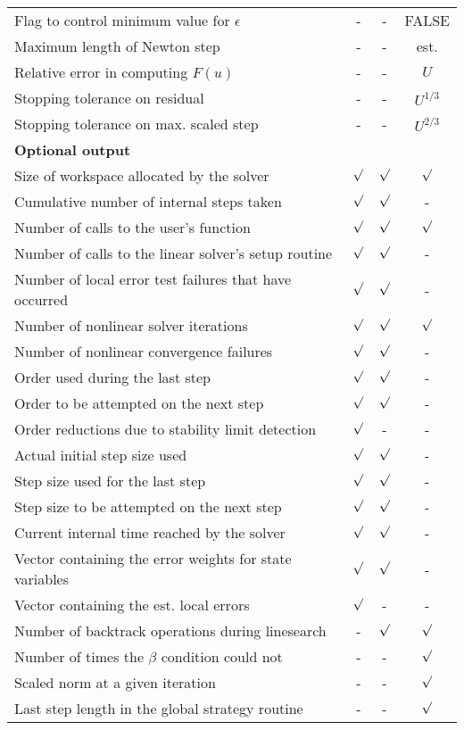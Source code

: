 \begin{table}[tp]
\begin{tabular}{|p{2.75in}|c|c|c|}
Flag to control minimum value for $\epsilon$ & - & - & FALSE \\
Maximum length of Newton step & - & - & est. \\
Relative error in computing $F(u)$ & - & - & $U$ \\
Stopping tolerance on residual & - & - & $U^{1/3}$ \\
Stopping tolerance on max. scaled step & - & - & $U^{2/3}$ \\
\hline
\hline
{\bf Optional output} &  &  & \\
\hline
Size of workspace allocated by the solver & $\surd$ & $\surd$ & $\surd$ \\
Cumulative number of internal steps taken & $\surd$ & $\surd$ & - \\
Number of calls to the user's function & $\surd$ & $\surd$ & $\surd$ \\
Number of calls to the linear solver's setup routine & $\surd$ & $\surd$ & - \\
Number of local error test failures that have occurred & $\surd$ & $\surd$ & - \\
Number of nonlinear solver iterations & $\surd$ & $\surd$ & $\surd$ \\
Number of nonlinear convergence failures & $\surd$ & $\surd$ & - \\
Order used during the last step & $\surd$ & $\surd$ & - \\
Order to be attempted on the next step & $\surd$ & $\surd$ & - \\
Order reductions due to stability limit detection & $\surd$ & - & - \\
Actual initial step size used & $\surd$ & $\surd$ & - \\
Step size used for the last step & $\surd$ & $\surd$ & - \\
Step size to be attempted on the next step & $\surd$ & $\surd$ & - \\
Current internal time reached by the solver & $\surd$ & $\surd$ & - \\
Vector containing the error weights for state variables & $\surd$ & $\surd$ & - \\
Vector containing the est. local errors & $\surd$ & - & - \\
Number of backtrack operations during linesearch & - & $\surd$ & $\surd$ \\
Number of times the $\beta$ condition could not & - & - & $\surd$ \\
Scaled norm at a given iteration & - & - & $\surd$ \\
Last step length in the global strategy routine & - & - & $\surd$ \\
\hline
\end{tabular}
\end{table}

